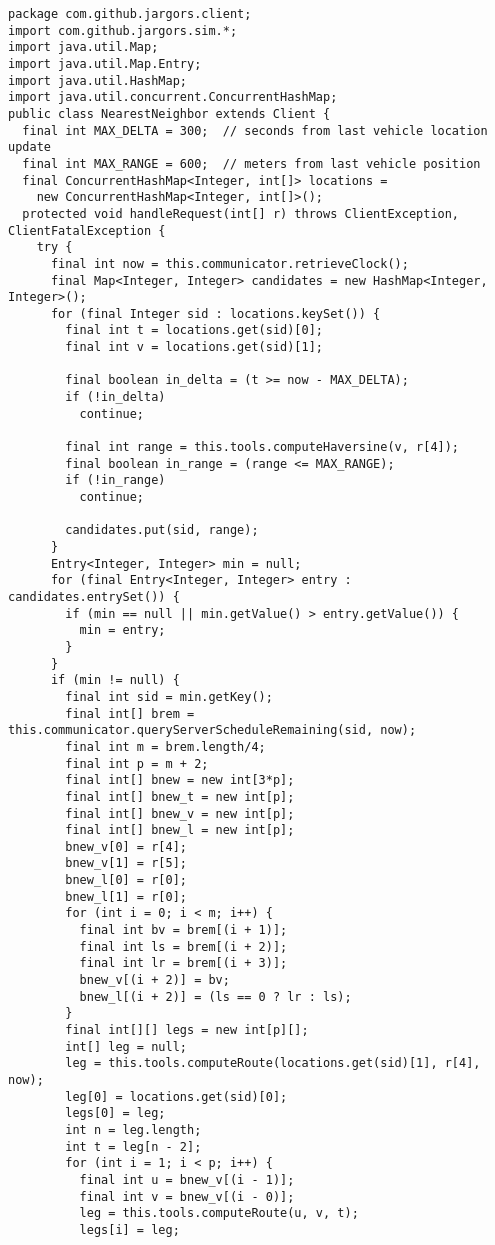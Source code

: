 {
\small
\begin{verbatim}
package com.github.jargors.client;
import com.github.jargors.sim.*;
import java.util.Map;
import java.util.Map.Entry;
import java.util.HashMap;
import java.util.concurrent.ConcurrentHashMap;
public class NearestNeighbor extends Client {
  final int MAX_DELTA = 300;  // seconds from last vehicle location update
  final int MAX_RANGE = 600;  // meters from last vehicle position
  final ConcurrentHashMap<Integer, int[]> locations =
    new ConcurrentHashMap<Integer, int[]>();
  protected void handleRequest(int[] r) throws ClientException, ClientFatalException {
    try {
      final int now = this.communicator.retrieveClock();
      final Map<Integer, Integer> candidates = new HashMap<Integer, Integer>();
      for (final Integer sid : locations.keySet()) {
        final int t = locations.get(sid)[0];
        final int v = locations.get(sid)[1];

        final boolean in_delta = (t >= now - MAX_DELTA);
        if (!in_delta)
          continue;

        final int range = this.tools.computeHaversine(v, r[4]);
        final boolean in_range = (range <= MAX_RANGE);
        if (!in_range)
          continue;

        candidates.put(sid, range);
      }
      Entry<Integer, Integer> min = null;
      for (final Entry<Integer, Integer> entry : candidates.entrySet()) {
        if (min == null || min.getValue() > entry.getValue()) {
          min = entry;
        }
      }
      if (min != null) {
        final int sid = min.getKey();
        final int[] brem = this.communicator.queryServerScheduleRemaining(sid, now);
        final int m = brem.length/4;
        final int p = m + 2;
        final int[] bnew = new int[3*p];
        final int[] bnew_t = new int[p];
        final int[] bnew_v = new int[p];
        final int[] bnew_l = new int[p];
        bnew_v[0] = r[4];
        bnew_v[1] = r[5];
        bnew_l[0] = r[0];
        bnew_l[1] = r[0];
        for (int i = 0; i < m; i++) {
          final int bv = brem[(i + 1)];
          final int ls = brem[(i + 2)];
          final int lr = brem[(i + 3)];
          bnew_v[(i + 2)] = bv;
          bnew_l[(i + 2)] = (ls == 0 ? lr : ls);
        }
        final int[][] legs = new int[p][];
        int[] leg = null;
        leg = this.tools.computeRoute(locations.get(sid)[1], r[4], now);
        leg[0] = locations.get(sid)[0];
        legs[0] = leg;
        int n = leg.length;
        int t = leg[n - 2];
        for (int i = 1; i < p; i++) {
          final int u = bnew_v[(i - 1)];
          final int v = bnew_v[(i - 0)];
          leg = this.tools.computeRoute(u, v, t);
          legs[i] = leg;


\end{verbatim}}
